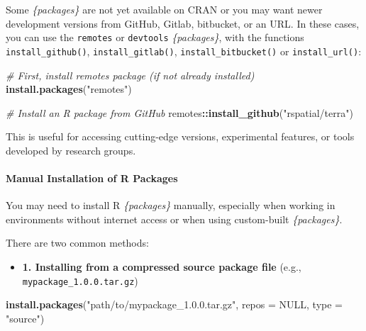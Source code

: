 \documentclass[
  10pt,
  b5paper,
  oneside]{book}
\newenvironment{Shaded}{\begin{snugshade}}{\end{snugshade}}
\newcommand{\AttributeTok}[1]{\textcolor[rgb]{0.13,0.29,0.53}{#1}}
\newcommand{\CommentTok}[1]{\textcolor[rgb]{0.56,0.35,0.01}{\textit{#1}}}
\newcommand{\ConstantTok}[1]{\textcolor[rgb]{0.56,0.35,0.01}{#1}}
\newcommand{\FunctionTok}[1]{\textcolor[rgb]{0.13,0.29,0.53}{\textbf{#1}}}
\newcommand{\NormalTok}[1]{#1}
\newcommand{\SpecialCharTok}[1]{\textcolor[rgb]{0.81,0.36,0.00}{\textbf{#1}}}
\newcommand{\StringTok}[1]{\textcolor[rgb]{0.31,0.60,0.02}{#1}}
\providecommand{\tightlist}{%
  \setlength{\itemsep}{0pt}\setlength{\parskip}{0pt}}
\begin{document}
Some \emph{\{packages\}} are not yet available on CRAN or you may want newer development versions from GitHub, Gitlab, bitbucket, or an URL.
In these cases, you can use the \texttt{remotes} or \texttt{devtools} \emph{\{packages\}}, with the functions \texttt{install\_github()}, \texttt{install\_gitlab()}, \texttt{install\_bitbucket()} or \texttt{install\_url()}:

\begin{Shaded}
\begin{Highlighting}[]
\CommentTok{\# First, install remotes package (if not already installed)}
\FunctionTok{install.packages}\NormalTok{(}\StringTok{"remotes"}\NormalTok{)}

\CommentTok{\# Install an R package from GitHub}
\NormalTok{remotes}\SpecialCharTok{::}\FunctionTok{install\_github}\NormalTok{(}\StringTok{"rspatial/terra"}\NormalTok{)}
\end{Highlighting}
\end{Shaded}

This is useful for accessing cutting-edge versions, experimental features, or tools developed by research groups.

\paragraph*{Manual Installation of R Packages}\label{manual-installation-of-r-packages}

You may need to install R \emph{\{packages\}} manually, especially when working in environments without internet access or when using custom-built \emph{\{packages\}}.

There are two common methods:

\begin{itemize}
\tightlist
\item
  \textbf{1. Installing from a compressed source package file} (e.g., \texttt{mypackage\_1.0.0.tar.gz})
\end{itemize}

\begin{Shaded}
\begin{Highlighting}[]
\FunctionTok{install.packages}\NormalTok{(}\StringTok{"path/to/mypackage\_1.0.0.tar.gz"}\NormalTok{, }\AttributeTok{repos =} \ConstantTok{NULL}\NormalTok{, }\AttributeTok{type =} \StringTok{"source"}\NormalTok{)}
\end{Highlighting}
\end{Shaded}
\end{document}

